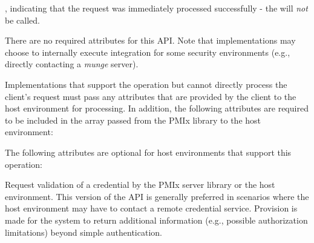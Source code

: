 \returnsimplenb

\returnstart
\begin{constantdesc}
\item {}, indicating that the request was immediately processed successfully - the  will \textit{not} be called.
\end{constantdesc}
\returnend

\reqattrstart
There are no required attributes for this \ac{API}. Note that implementations may choose to internally
execute integration for some security environments (e.g., directly
contacting a \textit{munge} server).

Implementations that support the operation but cannot directly process the client's request must pass any attributes that are provided by the client to the host environment for processing. In addition, the following attributes are required to be included in the  array passed from the \ac{PMIx} library to the host environment:


\reqattrend

\optattrstart
The following attributes are optional for host environments that support this operation:


\optattrend

\descr

Request validation of a credential by the \ac{PMIx} server library or the host environment. This version of the \ac{API} is generally preferred in scenarios where the host environment may have to contact a remote credential service. Provision is made for the system to return additional information (e.g., possible authorization limitations) beyond simple authentication.

